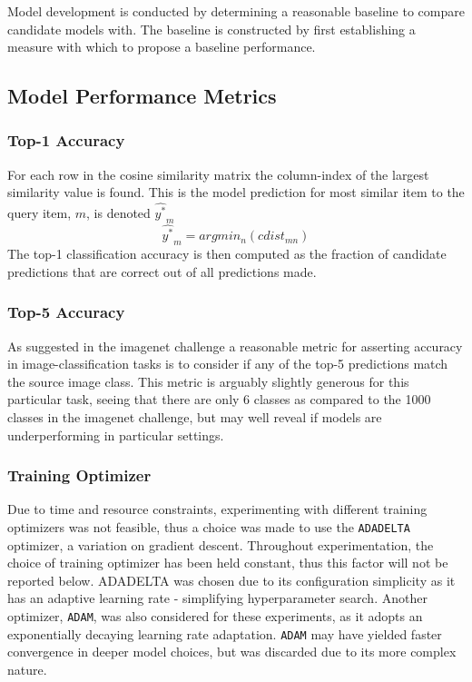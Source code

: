 Model development is conducted by determining a reasonable baseline to compare candidate models with. 
The baseline is constructed by first establishing a measure with which to propose a baseline performance. 

\subsection{Model Performance Metrics}\label{sec:MPM}
\subsubsection{Top-1 Accuracy}
For each row in the cosine similarity matrix the column-index of the largest similarity value is found. 
This is the model prediction for most similar item to the query item, $m$, is denoted $\widehat{y^{*}}_{m}$
$$
\widehat{y^{*}}_{m} = argmin_{n}(cdist_{mn})
$$
The top-1 classification accuracy is then computed as the fraction of candidate predictions that are correct out of all predictions made.

\subsubsection{Top-5 Accuracy}
As suggested in the imagenet challenge\autocite{ILSVRC15} a reasonable metric for asserting accuracy in image-classification tasks is to consider if any of the top-5 predictions match the source image class.
This metric is arguably slightly generous for this particular task, seeing that there are only 6 classes as compared to the 1000 classes in the imagenet challenge, but may well reveal if models are underperforming in particular settings.

\subsubsection{Training Optimizer}\label{hellosec}
Due to time and resource constraints, experimenting with different training optimizers was not feasible, thus a choice was made to use the \texttt{ADADELTA}\autocite{Zeiler2012} optimizer, a variation on gradient descent.
Throughout experimentation, the choice of training optimizer has been held constant, thus this factor will not be reported below.
ADADELTA was chosen due to its configuration simplicity as it has an adaptive learning rate - simplifying hyperparameter search.
Another optimizer, \texttt{ADAM}, was also considered for these experiments, as it adopts an exponentially decaying learning rate adaptation. 
\texttt{ADAM} may have yielded faster convergence in deeper model choices\autocite{Kingma2015}, but was discarded due to its more complex nature.

